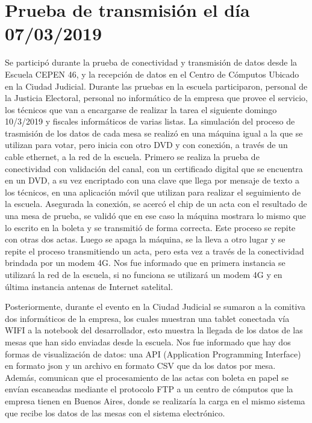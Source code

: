 \section{Prueba de transmisión el día 07/03/2019}
Se participó durante la prueba de conectividad y transmisión de datos desde la Escuela CEPEN 46, y la recepción de datos en el Centro de Cómputos Ubicado en la Ciudad Judicial.\newline
Durante las pruebas en la escuela participaron, personal de la Justicia Electoral, personal no informático de la empresa que provee el servicio, los técnicos que van a encargarse de realizar la tarea el siguiente domingo 10/3/2019 y fiscales informáticos de varias listas.\newline
La simulación del proceso de trasmisión de los datos de cada mesa se realizó en una máquina igual a la que se utilizan para votar, pero inicia con otro DVD y con conexión, a través de un cable ethernet, a la red de la escuela. Primero se realiza la prueba de conectividad con validación del canal, con un certificado digital que se encuentra en un DVD, a su vez encriptado con una clave que llega por mensaje de texto a los técnicos, en una aplicación móvil que utilizan para realizar el seguimiento de la escuela.\newline
Asegurada la conexión, se acercó el chip de un acta con el resultado de una mesa de prueba, se validó que en ese caso la máquina mostrara lo mismo que lo escrito en la boleta y se transmitió de forma correcta. Este proceso se repite con otras dos actas. Luego se apaga la máquina, se la lleva a otro lugar y se repite el proceso transmitiendo un acta, pero esta vez a través de la conectividad brindada por un modem 4G.
Nos fue informado que en primera instancia se utilizará la red de la escuela, si no funciona se utilizará un modem 4G y en última instancia antenas de Internet satelital.\newline

Posteriormente, durante el evento en la Ciudad Judicial se sumaron a la comitiva dos informáticos de la empresa, los cuales muestran una tablet conectada vía WIFI a la notebook del desarrollador, esto muestra la llegada de los datos de las mesas que han sido enviadas desde la escuela. Nos fue informado que hay dos formas de visualización de datos: una API (Application Programming Interface) en formato json y un archivo en formato CSV que da los datos por mesa. Además, comunican que el procesamiento de las actas con boleta en papel se envían escaneadas mediante el protocolo FTP a un centro de cómputos que la empresa tienen en Buenos Aires, donde se realizaría la carga en el mismo sistema que recibe los datos de las mesas con el sistema electrónico.\newline

